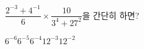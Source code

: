 $\dfrac{2^{-3}+4^{-1}}{6}\times\dfrac{10}{3^4+27^2}$을 간단히 하면?
\begin{choices32}{$6^{-6}$}{$6^{-5}$}{$6^{-4}$}{$12^{-3}$}{$12^{-2}$}\end{choices32}
